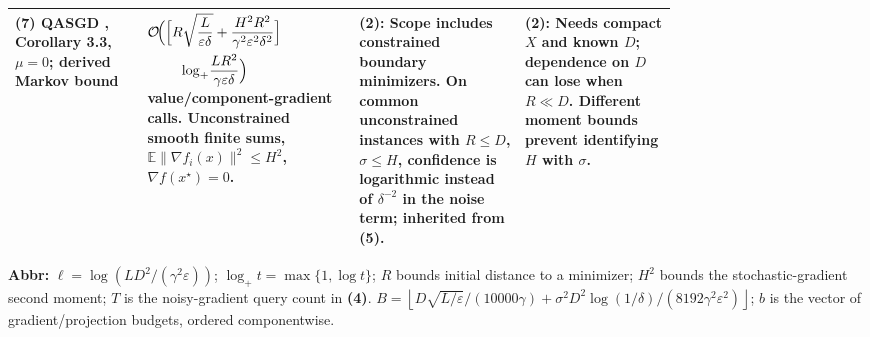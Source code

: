 \begin{table}[tp]
\begin{threeparttable}
\begin{tabularx}{\linewidth}{@{}>{\raggedright\arraybackslash}p{0.20\linewidth}>{\raggedright\arraybackslash}p{0.32\linewidth}>{\raggedright\arraybackslash}p{0.25\linewidth}>{\raggedright\arraybackslash}X@{}}
\midrule
\textbf{(7)} QASGD \citep{hdcqFu2023}, Corollary 3.3, $\mu=0$; derived Markov bound & $\begin{aligned}\mathcal{O}\!\Bigl(&\Bigl[R\sqrt{\frac{L}{\varepsilon\delta}}+\frac{H^2R^2}{\gamma^2\varepsilon^2\delta^2}\Bigr]\\&\quad\log_+\!\frac{LR^2}{\gamma\varepsilon\delta}\Bigr)\end{aligned}$ value/component-gradient calls. Unconstrained smooth finite sums, $\mathbb E\|\nabla f_i(x)\|^2\le H^2$, $\nabla f(x^\star)=0$. & \textbf{(2)}: Scope includes constrained boundary minimizers. On common unconstrained instances with $R\le D$, $\sigma\le H$, confidence is logarithmic instead of $\delta^{-2}$ in the noise term; inherited from \textbf{(5)}. & \textbf{(2)}: Needs compact $X$ and known $D$; dependence on $D$ can lose when $R\ll D$. Different moment bounds prevent identifying $H$ with $\sigma$. \\
\bottomrule
\end{tabularx}
\begin{tablenotes}[flushleft]\footnotesize
\item[] \textbf{Abbr:} $\ell=\log(LD^2/(\gamma^2\varepsilon))$; $\log_+t=\max\{1,\log t\}$; $R$ bounds initial distance to a minimizer; $H^2$ bounds the stochastic-gradient second moment; $T$ is the noisy-gradient query count in \textbf{(4)}.
$B=\left\lfloor D\sqrt{L/\varepsilon}/(10000\gamma)+\sigma^2D^2\log(1/\delta)/(8192\gamma^2\varepsilon^2)\right\rfloor$; $b$ is the vector of gradient/projection budgets, ordered componentwise.
\end{tablenotes}
\end{threeparttable}
\end{table}
\clearpage

